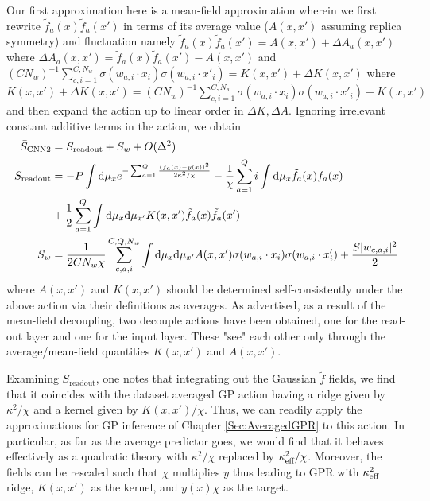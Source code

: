 Our first approximation here is a mean-field approximation wherein we first rewrite $\tilde{f}_a(x) \tilde{f}_a(x')$ in terms of its average value ($A(x,x')$ assuming replica symmetry) and fluctuation namely $\tilde{f}_a(x) \tilde{f}_a(x')=A(x,x')+\Delta A_a(x,x')$ where $\Delta A_a(x,x') = \tilde{f}_a(x) \tilde{f}_a(x')-A(x,x')$ and $(CN_w)^{-1}\sum_{c,i=1}^{C,N_w}\sigma({w}_{a,i} \cdot {x}_i)\sigma({w}_{a,i} \cdot {x}'_i)=K({x},{x}')+\Delta K({x},{x}')$ where $K({x},{x}')+\Delta K({x},{x}')=(CN_w)^{-1}\sum_{c,i=1}^{C,N_w}\sigma({w}_{a,i} \cdot {x}_i)\sigma({w}_{a,i} \cdot {x}'_i)-K({x},{x}')$ and then expand the action up to linear order in $\Delta K,\Delta A$. Ignoring irrelevant constant additive terms in the action, we obtain 
\begin{align}
\bar{S}_{\text{CNN2}} &= S_{\text{readout}}+S_{w}+O(\Delta^2) \\ \nonumber 
S_{\text{readout}} &= -P\int \text{d}\mu_x e^{-\sum_{a=1}^Q \frac{(f_a(x)-y(x))^2}{2\kappa^2/\chi}} - \frac{1}{\chi}\sum_{a=1}^Q i\int \text{d}\mu_x \tilde{f}_a(x) f_a(x) \\ \nonumber &+ \frac{1}{2}\sum_{a=1}^Q \int \text{d}\mu_x \text{d}\mu_{x'} K(x,x') \tilde{f}_a(x) \tilde{f}_a(x') \\ \nonumber 
S_{w} &= \frac{1}{2CN_w \chi} \sum_{c,a,i}^{C,Q,N_w} \int \text{d}\mu_x \text{d}\mu_{x'} A(x,x') \sigma({w}_{a,i} \cdot {x}_i)\sigma({w}_{a,i} \cdot {x}'_i) + \frac{S |{ w_{c,a,i}}|^2}{2}
\end{align}
where $A(x,x')$ and $K(x,x')$ should be determined self-consistently under the above action via their definitions as averages. As advertised, as a result of the mean-field decoupling, two decouple actions have been obtained, one for the read-out layer and one for the input layer. These "see" each other only through the average/mean-field quantities $K(x,x')$ and $A(x,x')$.

Examining $S_{\text{readout}}$, one notes that integrating out the Gaussian $\tilde{f}$ fields, we find that it coincides with the dataset averaged GP action having a ridge given by $\kappa^2/\chi$ and a kernel given by $K(x,x')/\chi$. Thus, we can readily apply the approximations for GP inference of Chapter \ref{Sec:AveragedGPR} to this action. In particular, as far as the average predictor goes, we would find that it behaves effectively as a quadratic theory with $\kappa^2/\chi$ replaced by $\kappa^2_{\text{eff}}/\chi$. Moreover, the fields can be rescaled such that $\chi$ multiplies $y$ thus leading to GPR with $\kappa^2_{\text{eff}}$ ridge, $K(x,x')$ as the kernel, and $y(x)\chi$ as the target. 

